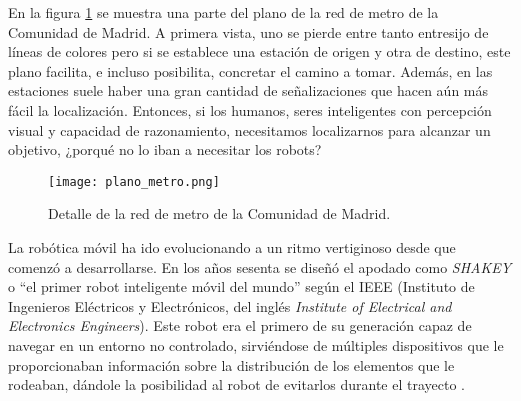 
En la figura \ref{fig:metro} se muestra una parte del plano de la red de metro de la Comunidad de Madrid. A primera vista, uno se pierde entre tanto entresijo de líneas de colores pero si se establece una estación de origen y otra de destino, este plano facilita, e incluso posibilita, concretar el camino a tomar. Además, en las estaciones suele haber una gran cantidad de señalizaciones que hacen aún más fácil la localización. Entonces, si los humanos, seres inteligentes con percepción visual y capacidad de razonamiento, necesitamos localizarnos para alcanzar un objetivo, ¿porqué no lo iban a necesitar los robots? \\

\begin{figure}[h]
	\begin{center} 
	\texttt{[image: plano\_metro.png]}
	\end{center}
	\caption{Detalle de la red de metro de la Comunidad de Madrid. \cite{metro_madrid}}
	\label{fig:metro}
\end{figure}


La robótica móvil ha ido evolucionando a un ritmo vertiginoso desde que comenzó a desarrollarse. En los años sesenta se diseñó el apodado como \textit{SHAKEY} o ``el primer robot inteligente móvil del mundo'' según el IEEE (Instituto de Ingenieros Eléctricos y Electrónicos, del inglés \textit{Institute of Electrical and Electronics Engineers}). Este robot era el primero de su generación capaz de navegar en un entorno no controlado, sirviéndose de múltiples dispositivos que le proporcionaban información sobre la distribución de los elementos que le rodeaban, dándole la posibilidad al robot de evitarlos durante el trayecto \cite{shakey1}.\\

